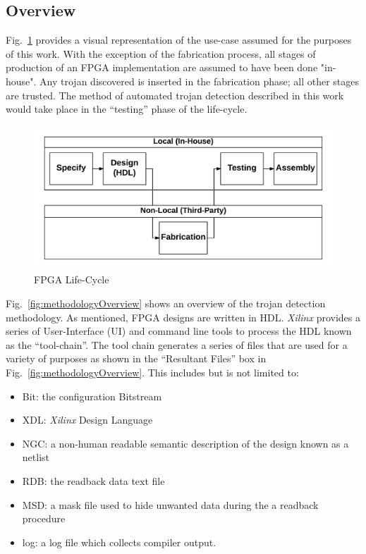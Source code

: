 \documentclass[journal, hidelinks]{IEEEtran}
\begin{document}
\subsection{Overview}
Fig.~\ref{fig:Concept} provides a visual representation of the use-case assumed for the purposes of this work. 
With the exception of the fabrication process, all stages of production of an FPGA implementation are assumed to have been done "in-house". 
Any trojan discovered is inserted in the fabrication phase; all other stages are trusted.  
The method of automated trojan detection described in this work would take place in the ``testing'' phase of the life-cycle. 
\begin{figure}[h]
	\centering
	\includegraphics[width=1\linewidth]{Figures/Concept}
	\caption[FPGA Life-Cycle]{FPGA Life-Cycle}
	\label{fig:Concept}
\end{figure}
Fig.~\ref{fig:methodologyOverview} shows an overview of the trojan detection methodology.
As mentioned, FPGA designs are written in HDL.
\textit{Xilinx} provides a series of User-Interface (UI) and command line tools to process the HDL known as the ``tool-chain''.
The tool chain generates a series of files that are used for a variety of purposes as shown in the ``Resultant Files'' box in Fig.~\ref{fig:methodologyOverview}.
This includes but is not limited to:
\begin{itemize}
	\item Bit: the configuration Bitstream
	\item XDL: \textit{Xilinx} Design Language
	\item NGC: a non-human readable semantic description of the design known as a netlist
	\item RDB: the readback data text file
	\item MSD: a mask file used to hide unwanted data during the a readback procedure
	\item log: a log file which collects compiler output.
\end{itemize}
\end{document}
